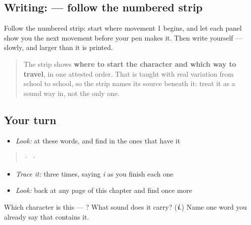 \subsection*{Writing:  — follow the numbered strip}

Follow the numbered strip: start where movement 1 begins, and let each panel show you the next movement before your pen makes it. Then write  yourself — slowly, and larger than it is printed.

\begin{quote}
The strip shows \textbf{where to start the character and which way to travel}, in one attested order. That is taught with real variation from school to school, so the strip names its source beneath it: treat it as a sound way in, not the only one.
\end{quote}

\subsection*{Your turn}
\begin{itemize}
\raggedright
  \item \emph{Look:} at these words, and find  in the ones that have it
\end{itemize}

\begin{quote}
  ·    ·  
\end{quote}

\begin{itemize}
\raggedright
  \item \emph{Trace it:}  three times, saying \emph{i} as you finish each one
  \item \emph{Look:} back at any page of this chapter and find  once more
\end{itemize}

\begin{tcolorbox}[breakable,colback=teal!4,colframe=teal!35!black,title={Before you move on}]
Which character is this — ? What sound does it carry? (\emph{\textbf{i}}.) Name one word you already say that contains it.
\end{tcolorbox}
